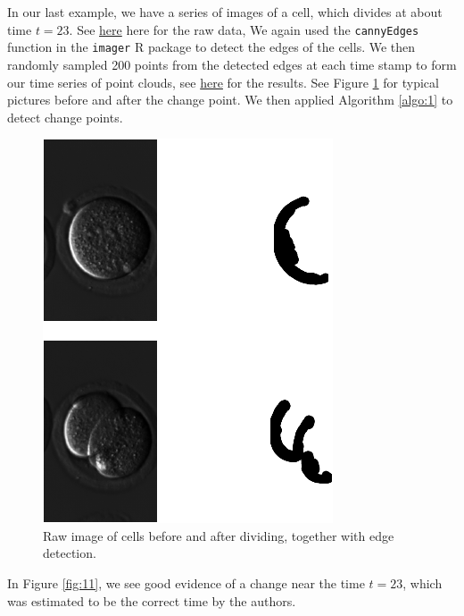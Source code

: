 \documentclass[smallextended]{svjour3}       %
\begin{document}
\begin{example}
In our last example, we have a series of images of a cell, which divides at
about time \(t = 23\). See \href{http://stat.slu.edu/~speegle/cellsRaw.gif}{here} here for the raw data, We again used the
\texttt{cannyEdges} function in the \texttt{imager} R package to detect
the edges of the cells. We then randomly sampled 200 points from the
detected edges at each time stamp to form our time series of point
clouds, see \href{http://stat.slu.edu/~speegle/mycells2.gif}{here} for the results. See Figure \ref{fig:10} for typical pictures before and after the change point. We
then applied Algorithm \ref{algo:1} to detect change points.


\begin{figure}[H]\includegraphics{springer_template_files/figure-latex/chunk_10_5-1} 
\caption{Raw image of cells before and after dividing, together with edge detection.}
\label{fig:10}\end{figure}

In Figure \ref{fig:11}, we see good evidence of a change near the time $t = 23$, which was estimated to be the correct time by the authors. 


\end{example}
\end{document}
